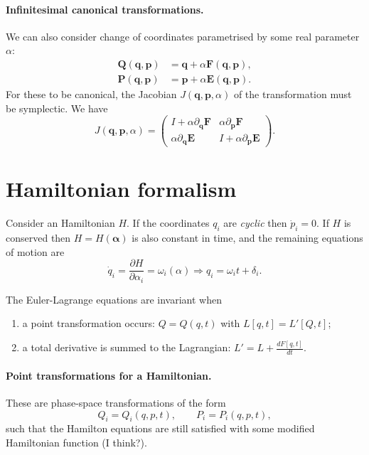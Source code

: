 \documentclass[12pt]{report}
\newcommand{\bs}[1]{\boldsymbol{#1}}
\begin{document}
\paragraph{Infinitesimal canonical transformations.}
We can also consider change of coordinates parametrised by some real parameter $\alpha$:
\begin{equation}
\begin{aligned}
	\bs Q(\bs q,\bs p) &= \bs q + \alpha \bs F(\bs q, \bs p), \\
	\bs P(\bs q,\bs p) &= \bs p + \alpha \bs E(\bs q, \bs p).
\end{aligned}
\end{equation}
For these to be canonical, the Jacobian $J(\bs q, \bs p,\alpha)$ of the transformation must be symplectic. We have
\begin{equation}
	J(\bs q, \bs p, \alpha) =
	\begin{pmatrix}
		I + \alpha \partial_{\bs q}\bs F & 
		\alpha \partial_{\bs p}\bs F \\
		\alpha \partial_{\bs q}\bs E &
		I + \alpha \partial_{\bs p}\bs E
	\end{pmatrix}.
\end{equation}

\section{Hamiltonian formalism}

Consider an Hamiltonian $H$.
If the coordinates $q_i$ are \emph{cyclic} then $\dot p_i=0$.
If $H$ is conserved then $H=H(\bs\alpha)$ is also constant in time, and the remaining equations of motion are
\begin{equation}
	\dot q_i = \frac{\partial H}{\partial\alpha_i} = \omega_i(\alpha)
	\Longrightarrow
	q_i = \omega_i t + \delta_i.
\end{equation}

The Euler-Lagrange equations are invariant when
\begin{enumerate}
	\item a point transformation occurs: $Q=Q(q,t)$ with $L[q,t]=L'[Q,t]$;
	\item a total derivative is summed to the Lagrangian: $L'=L+\frac{dF[q,t]}{dt}$.
\end{enumerate}

\paragraph{Point transformations for a Hamiltonian.}
These are phase-space transformations of the form
\begin{equation}
	Q_i = Q_i(q,p, t),\qquad
	P_i = P_i(q,p,t),
\end{equation}
such that the Hamilton equations are still satisfied with some modified Hamiltonian function (I think?).
\end{document}
